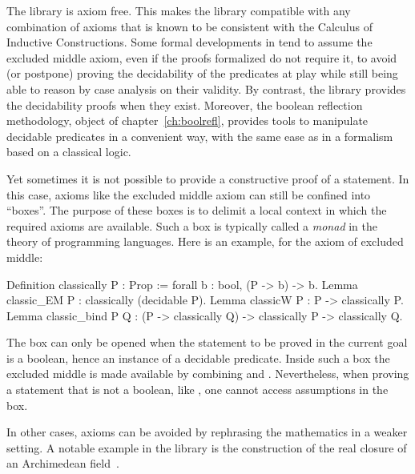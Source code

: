 The \mcbMC{} library is axiom free.  This makes the library compatible
with any combination of axioms that is known to be consistent with the
Calculus of Inductive Constructions. Some formal developments in
\Coq{} tend to assume the excluded middle axiom, even if the proofs
formalized do not require it, to avoid (or postpone) proving the
decidability of the predicates at play while still being able to
reason by case analysis on their validity. By contrast, the \mcbMC{}
library provides the decidability proofs when they exist. Moreover, the
boolean reflection methodology, object of chapter~\ref{ch:boolrefl},
provides tools to manipulate decidable predicates in a convenient way,
with the same ease as in a formalism based on a classical logic.

Yet sometimes it is not possible to provide a constructive proof of a
statement. In this case, axioms like the excluded middle axiom can
still be confined into ``boxes''. The purpose of these boxes is to
delimit a local context in which the required axioms are
available. Such a box is typically called a \emph{monad}
in the theory of programming languages. Here is an example, for the
axiom of excluded middle:

\begin{coq}{}{}
Definition classically P : Prop := forall b : bool, (P -> b) -> b.
Lemma classic_EM P : classically (decidable P).
Lemma classicW P : P -> classically P.
Lemma classic_bind P Q :
  (P -> classically Q) -> classically P -> classically Q.
\end{coq}
The  box can only be opened when the statement to be
proved in the current goal is a boolean, hence an instance of a
decidable predicate. Inside such a box the excluded middle is
made available by combining  and .
Nevertheless, when proving a statement that is not a boolean, like
, one cannot access assumptions in the  box.

In other cases, axioms can be avoided by rephrasing the mathematics
in a weaker setting.  A notable example in the \mcbMC{} library
is the construction of the real closure of an Archimedean
field~\cite{DBLP:conf/itp/Cohen12}.
